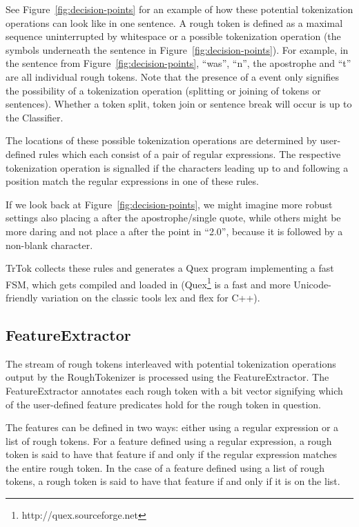 See Figure~\ref{fig:decision-points} for an example of how these
potential tokenization operations can look like in one sentence. A
rough token is defined as a maximal sequence uninterrupted by
whitespace or a possible tokenization operation (the symbols
underneath the sentence in Figure~\ref{fig:decision-points}). For
example, in the sentence from Figure~\ref{fig:decision-points},
``was'', ``n'', the apostrophe and ``t'' are all individual rough
tokens. Note that the presence of a \may{} event only signifies the
possibility of a tokenization operation (splitting or joining of
tokens or sentences). Whether a token split, token join or sentence
break will occur is up to the Classifier.

The locations of these possible tokenization operations are determined
by user-defined rules which each consist of a pair of regular
expressions. The respective tokenization operation is signalled if the
characters leading up to and following a position match the regular
expressions in one of these rules.

If we look back at Figure~\ref{fig:decision-points}, we might imagine
more robust settings also placing a \maybreaksentence{} after the
apostrophe/single quote, while others might be more daring and not
place a \maybreaksentence{} after the point in ``2.0'', because it is
followed by a non-blank character.

TrTok collects these rules and generates a Quex program implementing a
fast FSM, which gets compiled and loaded in
(Quex\footnote{http://quex.sourceforge.net} is a fast and more
Unicode-friendly variation on the classic tools lex and flex for C++).

\subsection{FeatureExtractor}

The stream of rough tokens interleaved with potential tokenization
operations output by the RoughTokenizer is processed using the
FeatureExtractor. The FeatureExtractor annotates each rough token with
a bit vector signifying which of the user-defined feature predicates
hold for the rough token in question.

The features can be defined in two ways: either using a regular
expression or a list of rough tokens. For a feature defined using a
regular expression, a rough token is said to have that feature if and
only if the regular expression matches the entire rough token. In the
case of a feature defined using a list of rough tokens, a rough token
is said to have that feature if and only if it is on the list.


